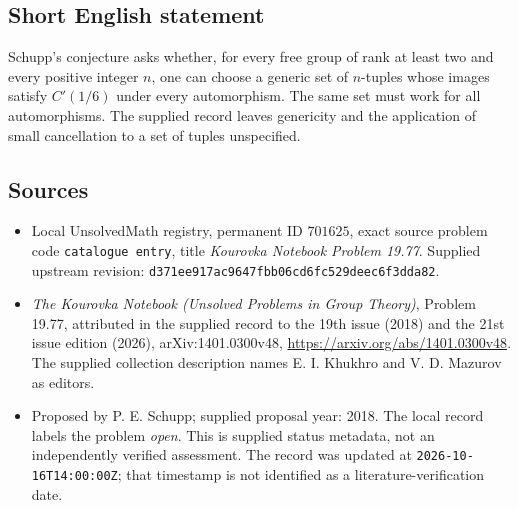 \documentclass[11pt]{article}
\begin{document}
\subsection{Short English statement}
Schupp's conjecture asks whether, for every free group of rank at least two and every positive integer \(n\), one can choose a generic set of \(n\)-tuples whose images satisfy \(C'(1/6)\) under every automorphism. The same set must work for all automorphisms. The supplied record leaves genericity and the application of small cancellation to a set of tuples unspecified.
\subsection{Sources}
\begin{itemize}
\item Local UnsolvedMath registry, permanent ID \(701625\), exact source problem code \texttt{catalogue entry}, title \emph{Kourovka Notebook Problem 19.77}. Supplied upstream revision: \texttt{d371ee917ac9647fbb06cd6fc529deec6f3dda82}.
\item \emph{The Kourovka Notebook (Unsolved Problems in Group Theory)}, Problem 19.77, attributed in the supplied record to the 19th issue (2018) and the 21st issue edition (2026), arXiv:1401.0300v48, \url{https://arxiv.org/abs/1401.0300v48}. The supplied collection description names E. I. Khukhro and V. D. Mazurov as editors.
\item Proposed by P. E. Schupp; supplied proposal year: 2018. The local record labels the problem \emph{open}. This is supplied status metadata, not an independently verified assessment. The record was updated at \texttt{2026-10-16T14:00:00Z}; that timestamp is not identified as a literature-verification date.
\end{itemize}
\end{document}
